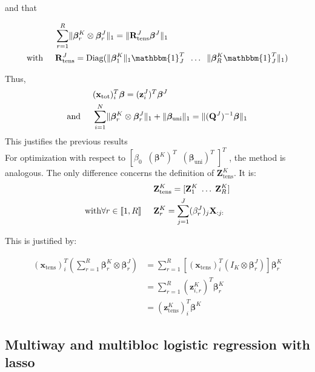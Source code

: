 \documentclass[10pt]{article}
\begin{document}
\noindent and that

\begin{align}
    &\sum\limits_{r = 1}^R \lVert \bm{\beta}_r^K \otimes \bm{\beta}_r^J \rVert_1 = \lVert \mathbf{R}_{\text{tens}}^J \bm{\beta}^J\rVert_1\\
    \text{with} \hspace{0.5 cm} &\mathbf{R}_{\text{tens}}^J = \text{Diag}(\lVert \bm{\beta}_1^K \rVert_1 \mathbbm{1}_J^T \; \; \hdots \; \;  \lVert \bm{\beta}_R^K \mathbbm{1}_J^T\rVert_1)
\end{align}

\noindent Thus,
\begin{align}
    &(\mathbf{x}_{\text{tot}})_i^T \bm{\beta}= (\mathbf{z}_i^J)^T \bm{\beta}^J  \\
    \text{and} \hspace{0.5 cm} & \sum\limits_{i = 1}^N 
    \lVert \bm{\beta}_r^K \otimes \bm{\beta}_r^J \rVert_1 + \lVert \bm{\beta}_{\text{uni}} \rVert_1= \lVert (\mathbf{Q}^J)^{-1} \bm{\beta} \rVert_1
\end{align}
This justifies the previous results\\[5 pt]
\noindent For optimization with respect to $\left[ \beta_0 \; \; \left(\bm{\beta}^K \right)^T \; \; \left( \bm{\beta}_{\text{uni}} \right)^T \; \right]^T$ , the method is analogous. The only difference concerns the definition of $\mathbf{Z}_{\text{tens}}^K$. It is:
\begin{align}
& \mathbf{Z}_{\text{tens}}^K = [\mathbf{Z}_1^K \; \hdots \; \mathbf{Z}_R^K]\\
\text{with} \forall r \in \llbracket 1, R \rrbracket \hspace{0.5 cm} & \mathbf{Z}_r^K = \sum\limits_{j = 1}^J (\beta_r^J)_j \mathbf{X}_{:j:}
\end{align}

\noindent This is justified by:

\begin{align}
    (\mathbf{x}_{\text{tens}})_i^T \left( \sum\limits_{r = 1}^R \bm{\beta}_r^K \otimes \bm{\beta}_r^J \right) &= \sum\limits_{r = 1}^R \left[ (\mathbf{x}_{\text{tens}})_i^T \left( I_K \otimes \bm{\beta}_r^J \right) \right] \bm{\beta}_r^K\\
    & = \sum\limits_{r = 1}^R (\mathbf{z}_{i,r}^K)^T \bm{\beta}_r^K\\
    & = (\mathbf{z}_{\text{tens}}^K)_i^T \bm{\beta}^K
\end{align}

\subsection{Multiway and multibloc logistic regression with lasso}
\end{document}
